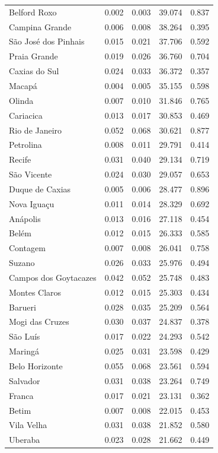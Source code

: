 \begin{longtable}{lrrrr}
Belford Roxo & 0.002 & 0.003 & 39.074 & 0.837 \\
Campina Grande & 0.006 & 0.008 & 38.264 & 0.395 \\
São José dos Pinhais & 0.015 & 0.021 & 37.706 & 0.592 \\
Praia Grande & 0.019 & 0.026 & 36.760 & 0.704 \\
Caxias do Sul & 0.024 & 0.033 & 36.372 & 0.357 \\
Macapá & 0.004 & 0.005 & 35.155 & 0.598 \\
Olinda & 0.007 & 0.010 & 31.846 & 0.765 \\
Cariacica & 0.013 & 0.017 & 30.853 & 0.469 \\
Rio de Janeiro & 0.052 & 0.068 & 30.621 & 0.877 \\
Petrolina & 0.008 & 0.011 & 29.791 & 0.414 \\
Recife & 0.031 & 0.040 & 29.134 & 0.719 \\
São Vicente & 0.024 & 0.030 & 29.057 & 0.653 \\
Duque de Caxias & 0.005 & 0.006 & 28.477 & 0.896 \\
Nova Iguaçu & 0.011 & 0.014 & 28.329 & 0.692 \\
Anápolis & 0.013 & 0.016 & 27.118 & 0.454 \\
Belém & 0.012 & 0.015 & 26.333 & 0.585 \\
Contagem & 0.007 & 0.008 & 26.041 & 0.758 \\
Suzano & 0.026 & 0.033 & 25.976 & 0.494 \\
Campos dos Goytacazes & 0.042 & 0.052 & 25.748 & 0.483 \\
Montes Claros & 0.012 & 0.015 & 25.303 & 0.434 \\
Barueri & 0.028 & 0.035 & 25.209 & 0.564 \\
Mogi das Cruzes & 0.030 & 0.037 & 24.837 & 0.378 \\
São Luís & 0.017 & 0.022 & 24.293 & 0.542 \\
Maringá & 0.025 & 0.031 & 23.598 & 0.429 \\
Belo Horizonte & 0.055 & 0.068 & 23.561 & 0.594 \\
Salvador & 0.031 & 0.038 & 23.264 & 0.749 \\
Franca & 0.017 & 0.021 & 23.131 & 0.362 \\
Betim & 0.007 & 0.008 & 22.015 & 0.453 \\
Vila Velha & 0.031 & 0.038 & 21.852 & 0.580 \\
Uberaba & 0.023 & 0.028 & 21.662 & 0.449 \\

\end{longtable}
